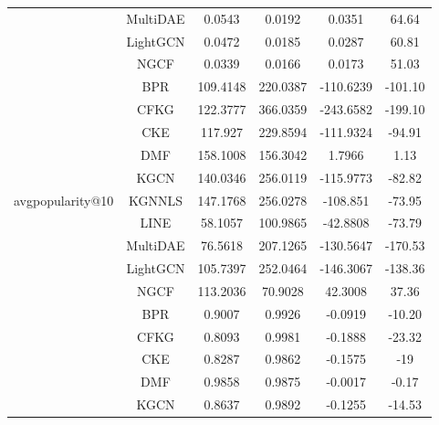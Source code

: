 \begin{table}[H]
{\begin{tabular}{|c|c|c|c|c|c|}
                                   & MultiDAE & 0.0543 & 0.0192 & 0.0351 & 64.64 \\ \cline{2-6} 
                                   & LightGCN & 0.0472 & 0.0185 & 0.0287 & 60.81 \\ \cline{2-6} 
                                   & NGCF & 0.0339 & 0.0166 & 0.0173 & 51.03 \\ \cline{2-6} 
        \hline
        \multirow{11}{*}{avgpopularity@10} & BPR & 109.4148 & 220.0387 & -110.6239 & -101.10 \\ \cline{2-6} 
                                            & CFKG & 122.3777 & 366.0359 & -243.6582 & -199.10 \\ \cline{2-6} 
                                            & CKE & 117.927 & 229.8594 & -111.9324 & -94.91 \\ \cline{2-6} 
                                            & DMF & 158.1008 & 156.3042 & 1.7966 & 1.13 \\ \cline{2-6} 
                                            & KGCN & 140.0346 & 256.0119 & -115.9773 & -82.82 \\ \cline{2-6} 
                                            & KGNNLS & 147.1768 & 256.0278 & -108.851 & -73.95 \\ \cline{2-6} 
                                            & LINE & 58.1057 & 100.9865 & -42.8808 & -73.79 \\ \cline{2-6} 
                                            & MultiDAE & 76.5618 & 207.1265 & -130.5647 & -170.53 \\ \cline{2-6} 
                                            & LightGCN & 105.7397 & 252.0464 & -146.3067 & -138.36 \\ \cline{2-6} 
                                            & NGCF & 113.2036 & 70.9028 & 42.3008 & 37.36 \\ \cline{2-6} 
        \hline
        \multirow{11}{*}{giniindex@10} & BPR & 0.9007 & 0.9926 & -0.0919 & -10.20 \\ \cline{2-6} 
                                        & CFKG & 0.8093 & 0.9981 & -0.1888 & -23.32 \\ \cline{2-6} 
                                        & CKE & 0.8287 & 0.9862 & -0.1575 & -19 \\ \cline{2-6} 
                                        & DMF & 0.9858 & 0.9875 & -0.0017 & -0.17 \\ \cline{2-6} 
                                        & KGCN & 0.8637 & 0.9892 & -0.1255 & -14.53 \\ \cline{2-6} 

\end{tabular}}
\end{table}
